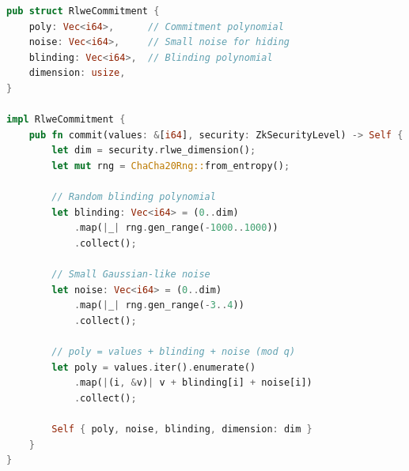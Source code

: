 \documentclass[11pt,a4paper]{article}
\begin{document}
\begin{lstlisting}[language=Rust, caption=RLWE Polynomial Commitment]
pub struct RlweCommitment {
    poly: Vec<i64>,      // Commitment polynomial
    noise: Vec<i64>,     // Small noise for hiding
    blinding: Vec<i64>,  // Blinding polynomial
    dimension: usize,
}

impl RlweCommitment {
    pub fn commit(values: &[i64], security: ZkSecurityLevel) -> Self {
        let dim = security.rlwe_dimension();
        let mut rng = ChaCha20Rng::from_entropy();

        // Random blinding polynomial
        let blinding: Vec<i64> = (0..dim)
            .map(|_| rng.gen_range(-1000..1000))
            .collect();

        // Small Gaussian-like noise
        let noise: Vec<i64> = (0..dim)
            .map(|_| rng.gen_range(-3..4))
            .collect();

        // poly = values + blinding + noise (mod q)
        let poly = values.iter().enumerate()
            .map(|(i, &v)| v + blinding[i] + noise[i])
            .collect();

        Self { poly, noise, blinding, dimension: dim }
    }
}
\end{lstlisting}
\end{document}
